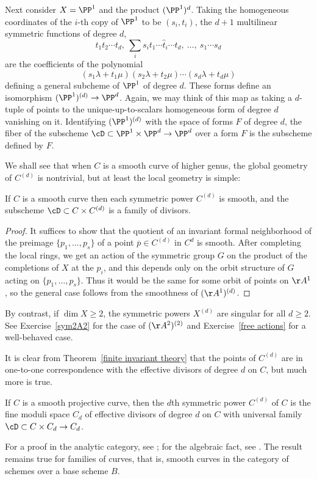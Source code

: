 Next consider $X = \PP^1$ and the product $(\PP^1)^d$. Taking the homogeneous coordinates of the
$i$-th copy of $\PP^1$ to be $(s_i,t_i)$, the $d+1$ multilinear symmetric functions of degree $d$,
$$
t_1t_2\cdots t_d,\ \sum_i s_it_1\cdots\hat t_i\cdots t_d,\ \dots,\ s_1\cdots s_d
$$
are the coefficients of the polynomial
$$
(s_1\lambda + t_1\mu)(s_2\lambda + t_2\mu)\cdots(s_d\lambda + t_d\mu)
$$
defining a general subcheme of $\PP^1$ of degree $d$. These forms  define
an isomorphism $(\PP^1)^{(d)} \to \PP^d$. 
Again, we may think of this map as taking a $d$-tuple of points to the unique-up-to-scalars
homogeneous form of degree $d$ vanishing on it.
Identifying $(\PP^1)^{(d)}$ with the space of forms
$F$ of degree $d$, the fiber of the subscheme $\cD\subset \PP^1 \times \PP^d \to \PP^d$
over a form $F$ is the subscheme defined by $F$.

We shall see that when $C$ is a smooth curve of higher genus, the global geometry of $C^{(d)}$ is nontrivial, but at least the local geometry is simple:

\begin{proposition}
If $C$ is a smooth curve then each symmetric power $C^{(d)}$ is smooth, and the subscheme
$\cD \subset C\times C^{(d)}$ is a family of divisors.
\end{proposition}

\begin{proof}
It suffices to
 show that the quotient of an invariant formal neighborhood of the preimage $\{p_1,\dots, p_s\}$ of a point
 $\overline p\in C^{(d)}$ in $C^d$  is smooth. After completing the local rings, we get an action of the symmetric group
 $G$ on the product of the completions of $X$ at the $p_i$, and this depends only on the orbit
 structure of $G$ acting on $\{p_1,\dots, p_s\}$. Thus it would be the same for some orbit of
 points on $\AA^1$, so the general case follows from the smoothness of $(\AA^{1})^{(d)}$.
 \end{proof}

By contrast, if $\dim X \geq 2$, the symmetric powers $X^{(d)}$ are singular for all $d \geq 2$.
See Exercise~\ref{sym2A2} for the case of $(\AA^2)^{(2)}$ and Exercise~\ref{free actions} for a well-behaved case.

It is clear from Theorem~\ref{finite invariant theory} that the points of $C^{(d)}$ are in one-to-one correspondence with the effective divisors of
degree $d$ on $C$, but much more is true. 

\begin{fact}
\begin{theorem}
If $C$ is a smooth projective curve, then the $d$th symmetric power $C^{(d)}$ of $C$ is the fine moduli space $C_d$ of effective divisors of degree $d$ on $C$ with universal family $\cD\subset C\times C_d \to C_d$.
\end{theorem}
For a proof in the analytic category, see \cite[p. 164]{ACGH}; for the algebraic fact, see \cite[Remark 9.3.9]{Kleiman-PicardScheme}. The result remains true for families of curves, that is, smooth curves in the category of schemes over
a base scheme $B$.
\end{fact}

